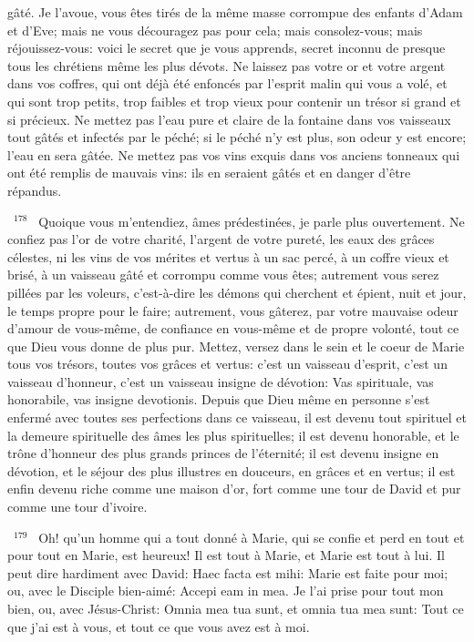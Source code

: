 \documentclass[paper=a5,pagesize=pdftex,fontsize=15pt,headinclude=on,twoside=off]{scrbook}
\newcommand{\negphantom}[1]{\settowidth{\dimen0}{#1}\hspace*{-\dimen0}}
\newcommand{\versenb}[1]{\par \vspace{10pt}~\negphantom{~${}^{#1}$~}${}^{#1}$~}
\begin{document}
gâté. Je l'avoue, vous êtes tirés de la même masse corrompue des enfants d'Adam et d'Eve; mais ne vous
découragez pas pour cela; mais consolez-vous; mais réjouissez-vous: voici le secret que je vous apprends, secret
inconnu de presque tous les chrétiens même les plus dévots.
Ne laissez pas votre or et votre argent dans vos coffres, qui ont déjà été enfoncés par l'esprit malin qui vous a
volé, et qui sont trop petits, trop faibles et trop vieux pour contenir un trésor si grand et si précieux. Ne mettez pas
l'eau pure et claire de la fontaine dans vos vaisseaux tout gâtés et infectés par le péché; si le péché n'y est plus,
son odeur y est encore; l'eau en sera gâtée. Ne mettez pas vos vins exquis dans vos anciens tonneaux qui ont été
remplis de mauvais vins: ils en seraient gâtés et en danger d'être répandus.
\versenb{178} Quoique vous m'entendiez, âmes prédestinées, je parle plus ouvertement. Ne confiez pas l'or de votre
charité, l'argent de votre pureté, les eaux des grâces célestes, ni les vins de vos mérites et vertus à un sac percé,
à un coffre vieux et brisé, à un vaisseau gâté et corrompu comme vous êtes; autrement vous serez pillées par les
voleurs, c'est-à-dire les démons qui cherchent et épient, nuit et jour, le temps propre pour le faire; autrement, vous
gâterez, par votre mauvaise odeur d'amour de vous-même, de confiance en vous-même et de propre volonté, tout
ce que Dieu vous donne de plus pur. Mettez, versez dans le sein et le coeur de Marie tous vos trésors, toutes vos
grâces et vertus: c'est un vaisseau d'esprit, c'est un vaisseau d'honneur, c'est un vaisseau insigne de dévotion:
Vas spirituale, vas honorabile, vas insigne devotionis. Depuis que Dieu même en personne s'est enfermé avec
toutes ses perfections dans ce vaisseau, il est devenu tout spirituel et la demeure spirituelle des âmes les plus
spirituelles; il est devenu honorable, et le trône d'honneur des plus grands princes de l'éternité; il est devenu
insigne en dévotion, et le séjour des plus illustres en douceurs, en grâces et en vertus; il est enfin devenu riche
comme une maison d'or, fort comme une tour de David et pur comme une tour d'ivoire.
\versenb{179} Oh! qu'un homme qui a tout donné à Marie, qui se confie et perd en tout et pour tout en Marie, est heureux! Il
est tout à Marie, et Marie est tout à lui. Il peut dire hardiment avec David: Haec facta est mihi: Marie est faite pour
moi; ou, avec le Disciple bien-aimé: Accepi eam in mea. Je l'ai prise pour tout mon bien, ou, avec Jésus-Christ:
Omnia mea tua sunt, et omnia tua mea sunt: Tout ce que j'ai est à vous, et tout ce que vous avez est à moi.
\end{document}
